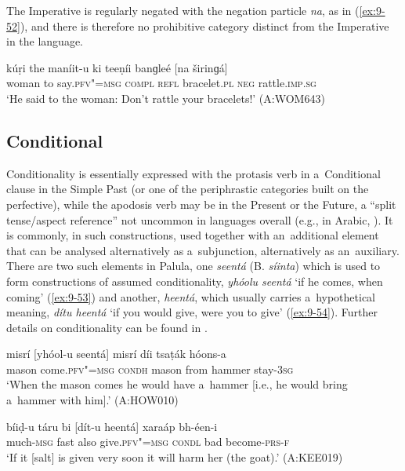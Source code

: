 The Imperative is regularly negated with the negation particle \textit{na}, as in (\ref{ex:9-52}), and there is therefore no prohibitive category distinct from the Imperative in the language.

\begin{exe}
\ex
\label{ex:9-52}
\gll kúṛi the maníit-u ki teeṇíi banɡleé [na širinɡá] \\
woman to say.\textsc{pfv"=msg} \textsc{compl} \textsc{refl} bracelet.\textsc{pl} \textsc{neg} rattle.\textsc{imp.sg} \\
\glt `He said to the woman: Don't rattle your bracelets!' (A:WOM643)
\end{exe}

\subsection{Conditional}
\label{subsec:9-2-2}

Conditionality is essentially expressed with the protasis verb in a~Conditional clause in the Simple Past (or one of the periphrastic categories built on the perfective), while the apodosis verb may be in the Present or the Future, a ``split tense/aspect reference'' not uncommon in languages overall (e.g., in Arabic, \citealt[80]{dahl1985}). It is commonly, in such constructions, used together with an~additional element that can be analysed alternatively as a~subjunction, alternatively as an~auxiliary. There are two such elements in Palula, one \textit{seentá} (B. \textit{síinta}) which is used to form constructions of assumed conditionality, \textit{yhóolu seentá} `if he comes, when coming' (\ref{ex:9-53}) and another, \textit{heentá}, which usually carries a~hypothetical meaning, \textit{dítu heentá} `if you would give, were you to give' (\ref{ex:9-54}). Further details on conditionality can be found in . 

\begin{exe}
\ex
\label{ex:9-53}
\gll misrí [yhóol-u seentá] misrí díi tsaṭák hóons-a \\
mason come.\textsc{pfv"=msg} \textsc{condh} mason from hammer stay-\textsc{3sg} \\
\glt `When the mason comes he would have a~hammer [i.e., he would bring a~hammer with him].' (A:HOW010)

\ex
\label{ex:9-54}
\gll bíiḍ-u táru bi [dít-u heentá] xaraáp bh-éen-i \\
much-\textsc{msg} fast also give.\textsc{pfv"=msg} \textsc{condl} bad become-\textsc{prs-f} \\
\glt `If it [salt] is given very soon it will harm her (the goat).' (A:KEE019)
\end{exe}

